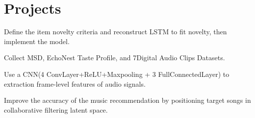 \documentclass[letterpaper]{deedy-resume} %
\begin{document}
\begin{minipage}[t]{0.69\textwidth}




\sectionspace %



\section{Projects}

\begin{tightitemize}
\item Define the item novelty criteria and reconstruct LSTM to fit novelty, then implement the model.
\end{tightitemize}

\sectionspace %

\begin{tightitemize}
\item Collect MSD, EchoNest Taste Profile, and 7Digital Audio Clips Datasets.
\item Use a CNN(4 ConvLayer+ReLU+Maxpooling + 3 FullConnectedLayer) to extraction frame-level features of audio signals.
\item Improve the accuracy of the music recommendation by positioning target songs in collaborative filtering latent space.
\end{tightitemize}


\end{minipage}
\end{document}
